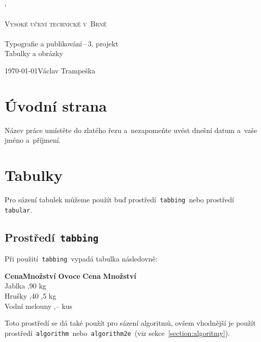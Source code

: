 \documentclass[a4paper, 11pt] {article}
\begin{document}
\catcode`
\begin{titlepage}
\begin{center}
{\Huge\textsc{Vysoké učení technické v~Brně}}\\
\\
{\LARGE Typografie a publikování\,--\,3. projekt}\\
\Huge {Tabulky a obrázky\\}
\end{center}
{\Large\today\hfill Václav Trampeška}
\end{titlepage}


\section{Úvodní strana}
Název práce umístěte do zlatého řezu a~nezapomeňte uvést dnešní datum a~vaše jméno a~příjmení.
\section{Tabulky}
Pro sázení tabulek můžeme použít buď prostředí\texttt{ tabbing }nebo prostředí\texttt{ tabular}.
\subsection{Prostředí\texttt{ tabbing}}
Při použití\texttt{ tabbing }vypadá tabulka následovně:
\begin{tabbing}
	\hspace*{7.4em}\=\textbf{Cena}\quad\thinspace\= \textbf{Množství}\kill
	\textbf{Ovoce} \> \textbf{Cena}\> \textbf{Množství}\\
	Jablka ,90	 kg	\\
	Hrušky ,40 ,5 kg \\
	Vodní melouny ,--  kus \\
\end{tabbing}
Toto prostředí se dá také použít pro sázení algoritmů, ovšem vhodnější je použít prostředí\texttt{ algorithm }nebo\texttt{ algorithm2e }(viz sekce~\ref{section:algoritmy}).
\end{document}
